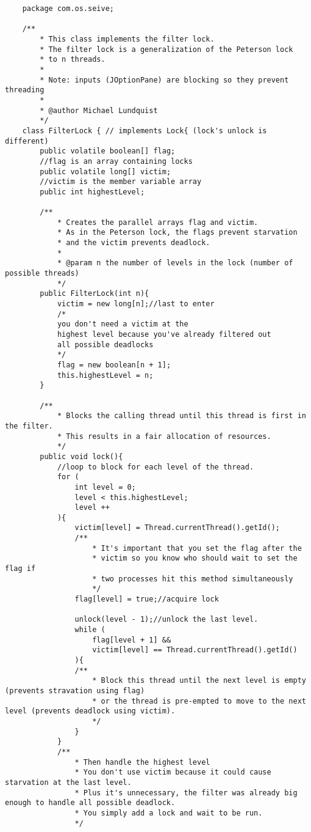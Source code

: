\documentclass[titlepage]{article}
\begin{document}
\begin{lstlisting}
    package com.os.seive;

    /**
        * This class implements the filter lock.
        * The filter lock is a generalization of the Peterson lock
        * to n threads.
        * 
        * Note: inputs (JOptionPane) are blocking so they prevent threading
        * 
        * @author Michael Lundquist
        */
    class FilterLock { // implements Lock{ (lock's unlock is different)
        public volatile boolean[] flag;
        //flag is an array containing locks
        public volatile long[] victim;
        //victim is the member variable array
        public int highestLevel;
    
        /**
            * Creates the parallel arrays flag and victim.
            * As in the Peterson lock, the flags prevent starvation
            * and the victim prevents deadlock.
            * 
            * @param n the number of levels in the lock (number of possible threads)
            */
        public FilterLock(int n){
            victim = new long[n];//last to enter
            /*
            you don't need a victim at the 
            highest level because you've already filtered out
            all possible deadlocks
            */
            flag = new boolean[n + 1];
            this.highestLevel = n;
        }
        
        /**
            * Blocks the calling thread until this thread is first in the filter.
            * This results in a fair allocation of resources.
            */
        public void lock(){
            //loop to block for each level of the thread.
            for (
                int level = 0;
                level < this.highestLevel;
                level ++
            ){
                victim[level] = Thread.currentThread().getId();
                /**
                    * It's important that you set the flag after the 
                    * victim so you know who should wait to set the flag if
                    * two processes hit this method simultaneously
                    */
                flag[level] = true;//acquire lock
    
                unlock(level - 1);//unlock the last level.
                while (
                    flag[level + 1] &&
                    victim[level] == Thread.currentThread().getId()
                ){
                /**
                    * Block this thread until the next level is empty (prevents stravation using flag)
                    * or the thread is pre-empted to move to the next level (prevents deadlock using victim).
                    */
                }
            }
            /**
                * Then handle the highest level
                * You don't use victim because it could cause starvation at the last level.
                * Plus it's unnecessary, the filter was already big enough to handle all possible deadlock.
                * You simply add a lock and wait to be run.
                */
    

\end{lstlisting}
\end{document}
